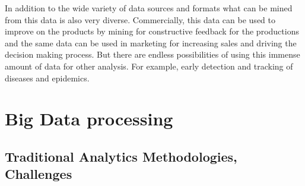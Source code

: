 \documentclass[sigconf]{acmart}
\begin{document}
In addition to the wide variety of data sources and formats what can be mined from this data is also very diverse\cite{ncsupost}\cite{KaplanChallengesSM}. Commercially, this data can be used to improve on the products by mining for constructive feedback for the productions and the same data can be used in marketing for increasing sales and driving the decision making process. But there are endless possibilities of using this immense amount of data for other analysis. For example, early detection and tracking of diseases and epidemics\cite{detectingoutbreaks}.

\section{Big Data processing}
\subsection{Traditional Analytics Methodologies, Challenges}
\end{document}
